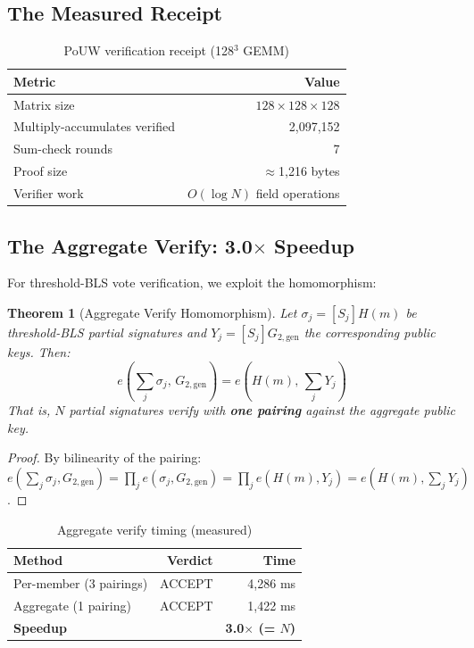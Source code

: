 \documentclass[11pt, a4paper]{article}
\newtheorem{theorem}{Theorem}
\begin{document}
\subsection{The Measured Receipt}

\begin{table}[h]
\centering
\caption{PoUW verification receipt (128$^3$ GEMM)}
\begin{tabular}{lr}
\toprule
\textbf{Metric} & \textbf{Value} \\
\midrule
Matrix size & $128 \times 128 \times 128$ \\
Multiply-accumulates verified & 2{,}097{,}152 \\
Sum-check rounds & 7 \\
Proof size & $\approx$1{,}216 bytes \\
Verifier work & $O(\log N)$ field operations \\
\bottomrule
\end{tabular}
\end{table}

\subsection{The Aggregate Verify: 3.0$\times$ Speedup}

For threshold-BLS vote verification, we exploit the homomorphism:

\begin{theorem}[Aggregate Verify Homomorphism]
\label{thm:agg}
Let $\sigma_j = [S_j]H(m)$ be threshold-BLS partial signatures and $Y_j = [S_j]G_{2,\mathrm{gen}}$ the corresponding public keys. Then:
\begin{equation}
e\!\left(\textstyle\sum_j \sigma_j,\, G_{2,\mathrm{gen}}\right) = e\!\left(H(m),\, \textstyle\sum_j Y_j\right)
\end{equation}
That is, $N$ partial signatures verify with \textbf{one pairing} against the aggregate public key.
\end{theorem}
\begin{proof}
By bilinearity of the pairing: $e(\sum_j \sigma_j, G_{2,\mathrm{gen}}) = \prod_j e(\sigma_j, G_{2,\mathrm{gen}}) = \prod_j e(H(m), Y_j) = e(H(m), \sum_j Y_j)$.
\end{proof}

\begin{table}[h]
\centering
\caption{Aggregate verify timing (measured)}
\begin{tabular}{lrr}
\toprule
\textbf{Method} & \textbf{Verdict} & \textbf{Time} \\
\midrule
Per-member (3 pairings) & ACCEPT & 4{,}286 ms \\
Aggregate (1 pairing) & ACCEPT & 1{,}422 ms \\
\midrule
\textbf{Speedup} & & \textbf{3.0$\times$ (= $N$)} \\
\bottomrule
\end{tabular}
\end{table}
\end{document}
